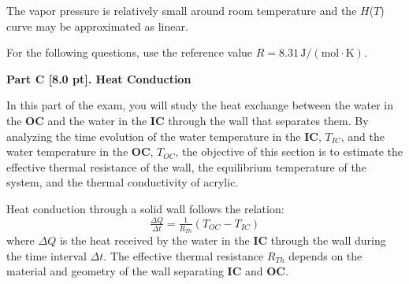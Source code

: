 The vapor pressure is relatively small around room temperature and the
$H$($T$) curve may be approximated as linear.

\noindent{}

\noindent{}

For the following questions, use the reference value
$R = 8.31\,\mathrm{J/(mol{\cdot}K)}$.

\noindent{}

\noindent{}

{\large\textbf{Part C [8.0 pt]. Heat Conduction}}

In this part of the exam, you will study the heat exchange between the water in
the \textbf{OC} and the water in the \textbf{IC} through the wall that
separates them. By analyzing the time evolution of the water temperature in the
\textbf{IC}, $T_{IC}$, and the water temperature in the \textbf{OC}, $T_{OC}$,
the objective of this section is to estimate the effective thermal resistance
of the wall, the equilibrium temperature of the system, and the thermal
conductivity of acrylic.

Heat conduction through a solid wall follows the relation:
\begin{equation}
\tfrac{\Delta Q}{\Delta t} = \tfrac{1}{R_{Th}}(T_{OC} - T_{IC}) \tag{4}
\end{equation}
where $\Delta Q$ is the heat received by the water in the \textbf{IC} through
the wall during the time interval $\varDelta t$. The effective thermal
resistance $R_{Th}$ depends on the material and geometry of the wall separating
\textbf{IC} and \textbf{OC}.

